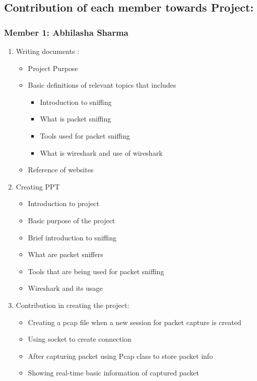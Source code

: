 \documentclass[12pt, a4paper]{report}
\begin{document}
\subsection{Contribution of each member towards Project:}

\subsubsection{Member 1: Abhilasha Sharma}
\begin{enumerate}
    \item Writing documents :
        \begin{itemize}
        \item   Project Purpose
        \item   Basic definitions of  relevant topics that includes
                \begin{itemize}
                        \item Introduction to sniffing
                        \item What is packet sniffing
                        \item Tools used for packet sniffing
                        \item What is wireshark and use of wireshark
                \end{itemize}		
        \item   Reference of websites

    \end{itemize}
    
    \item Creating PPT
        \begin{itemize}
            \item Introduction to project 
            \item    	Basic purpose of the project 
            \item    	Brief introduction to sniffing
            \item    	What are packet sniffers
            \item    	Tools that are being used for packet sniffing
	        \item            Wireshark and its usage
        \end{itemize}
    
    \item Contribution in creating the project:

        \begin{itemize}
            \item Creating a pcap file when a new session for packet capture is created
        	\item Using socket to create connection
        	\item After capturing packet using Pcap class to store packet info
        	\item Showing real-time basic information of captured packet
        \end{itemize}
\end{enumerate}
\end{document}
